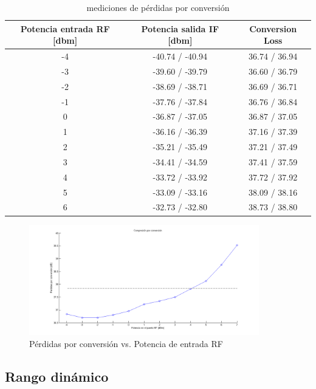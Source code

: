 \documentclass[a4paper,10pt]{article}
\begin{document}
	\begin{table}[!htp]
		\centering
		\begin{tabular}{|c|c|c|}
			\hline
			Potencia entrada RF [dbm] & Potencia salida IF [dbm] & Conversion 
			Loss \\
			\hline
			-4 & -40.74 / -40.94 & 36.74 / 36.94 \\
			\hline
			-3 & -39.60 / -39.79 & 36.60 / 36.79 \\
			\hline
			-2 & -38.69 / -38.71 & 36.69 / 36.71 \\
			\hline
			-1 & -37.76 / -37.84 & 36.76 / 36.84 \\
			\hline
			0 & -36.87 / -37.05 & 36.87 / 37.05 \\
			\hline
			1 & -36.16 / -36.39 & 37.16 / 37.39 \\
			\hline
			2 & -35.21 / -35.49 & 37.21 / 37.49 \\
			\hline
			3 & -34.41 / -34.59 & 37.41 / 37.59 \\
			\hline
			4 & -33.72 / -33.92 & 37.72 / 37.92 \\
			\hline
			5 & -33.09 / -33.16 & 38.09 / 38.16 \\
			\hline
			6 & -32.73 / -32.80 & 38.73 / 38.80 \\
			\hline
		\end{tabular}
		\caption{mediciones de pérdidas por conversión}
		\label{tablaCompresion}
	\end{table}	

	\begin{figure}[!htb]
		\centering
		\includegraphics[width=10cm]{Images/compresion.png}
		\caption{P\'erdidas por conversi\'on vs. Potencia de entrada RF}
		\label{compresion}
	\end{figure}	
	
	\subsection{Rango din\'amico}
	\newpage
\end{document}
